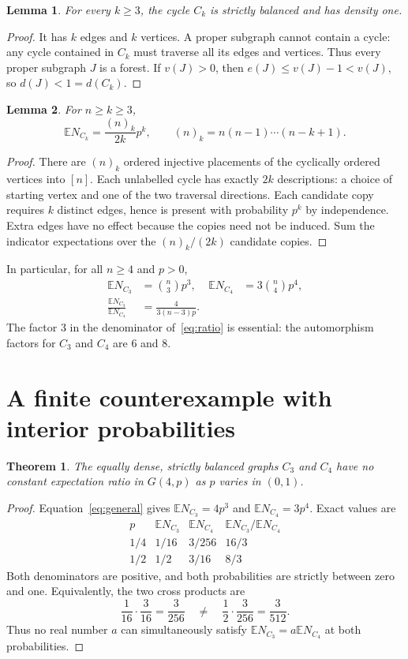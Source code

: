 \documentclass[11pt]{article}
\newtheorem{theorem}{Theorem}
\newtheorem{lemma}{Lemma}
\newcommand{\E}{\mathbb E}
\begin{document}
\begin{lemma}
For every $k\geq3$, the cycle $C_k$ is strictly balanced and has density one.
\end{lemma}
\begin{proof}
It has $k$ edges and $k$ vertices. A proper subgraph cannot contain a cycle:
any cycle contained in $C_k$ must traverse all its edges and vertices. Thus
every proper subgraph $J$ is a forest. If $v(J)>0$, then
$e(J)\leq v(J)-1<v(J)$, so $d(J)<1=d(C_k)$.
\end{proof}

\begin{lemma}\label{lem:count}
For $n\geq k\geq3$,
\[
 \E N_{C_k}=\frac{(n)_k}{2k}p^k,
 \qquad (n)_k=n(n-1)\cdots(n-k+1).
\]
\end{lemma}
\begin{proof}
There are $(n)_k$ ordered injective placements of the cyclically ordered
vertices into $[n]$. Each unlabelled cycle has exactly $2k$ descriptions:
a choice of starting vertex and one of the two traversal directions.
Each candidate copy requires $k$ distinct edges, hence is present with
probability $p^k$ by independence. Extra edges have no effect because the
copies need not be induced. Sum the indicator expectations over the
$(n)_k/(2k)$ candidate copies.
\end{proof}

In particular, for all $n\geq4$ and $p>0$,
\begin{align}
 \E N_{C_3}&=\binom n3p^3,&
 \E N_{C_4}&=3\binom n4p^4,\label{eq:general}\\
 \frac{\E N_{C_3}}{\E N_{C_4}}
   &=\frac{4}{3(n-3)p}.\label{eq:ratio}
\end{align}
The factor $3$ in the denominator of~\eqref{eq:ratio} is essential:
the automorphism factors for $C_3$ and $C_4$ are $6$ and $8$.

\section{A finite counterexample with interior probabilities}
\begin{theorem}\label{thm:counter}
The equally dense, strictly balanced graphs $C_3$ and $C_4$ have no constant
expectation ratio in $G(4,p)$ as $p$ varies in $(0,1)$.
\end{theorem}
\begin{proof}
Equation~\eqref{eq:general} gives $\E N_{C_3}=4p^3$ and
$\E N_{C_4}=3p^4$. Exact values are
\[
\begin{array}{c|c|c|c}
 p&\E N_{C_3}&\E N_{C_4}&\E N_{C_3}/\E N_{C_4}\\ \hline
 1/4&1/16&3/256&16/3\\
 1/2&1/2&3/16&8/3
\end{array}
\]
Both denominators are positive, and both probabilities are strictly
between zero and one. Equivalently, the two cross products are
\[
 \frac1{16}\cdot\frac3{16}=\frac3{256}
 \quad\ne\quad
 \frac12\cdot\frac3{256}=\frac3{512}.
\]
Thus no real number $a$ can simultaneously satisfy
$\E N_{C_3}=a\E N_{C_4}$ at both probabilities.
\end{proof}
\end{document}
